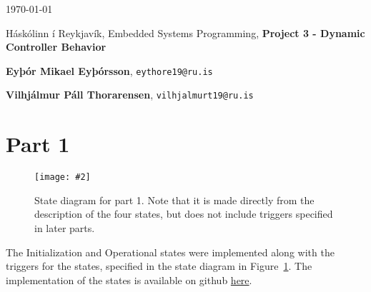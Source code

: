 \documentclass{article}
\def\partonecommit{https://github.com/mikaeleythor/embe-project-3/blob/d7936fce08715c55a20739b971156213114eb7e9}
\newcommand{\state}[3]{
    \begin{figure}[h]
        \begin{center}
            \texttt{[image: \#2]}
        \end{center}
        \caption{#3}\label{fig:state-part-#1}
    \end{figure}
}
\newcommand{\implementation}[2]{The implementation of #1 is available on github
\href{#2}{here}}
\begin{document}
\today \par
\vspace{.5cm}
\noindent Háskólinn í Reykjavík, Embedded Systems Programming, \textbf{Project 3 - Dynamic
	Controller Behavior} \par
\noindent \textbf{Eyþór Mikael Eyþórsson}, \texttt{eythore19@ru.is}\par
\noindent \textbf{Vilhjálmur Páll Thorarensen}, \texttt{vilhjalmurt19@ru.is}\par

\section*{Part 1}
\state{1}{../code/docs/diagrams/src/state-part1.mmd.png}{
    State diagram for part 1. Note that it is made directly from the description of the
    four states, but does not include triggers specified in later parts.
}

The Initialization and Operational states were implemented along with the triggers for the
states, specified in the state diagram in Figure~\ref{fig:state-part-1}.
\implementation{the states}{\partonecommit/code}.

\end{document}
